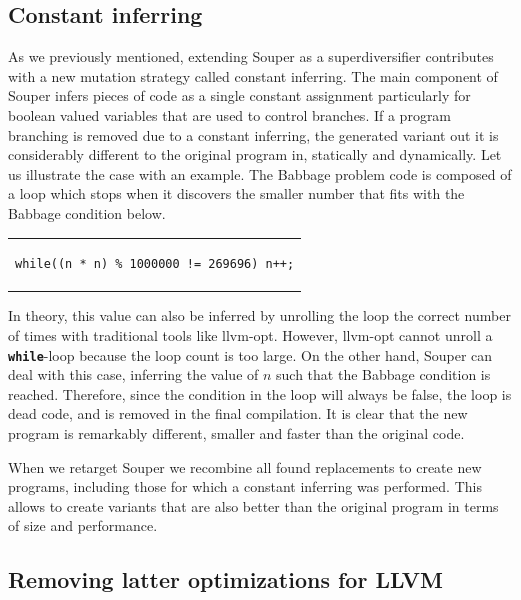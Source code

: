 \subsection*{Constant inferring}

As we previously mentioned, extending Souper as a superdiversifier contributes with a new mutation strategy called constant inferring. 
The main component of Souper infers pieces of code as a single constant assignment particularly for boolean valued variables that are used to control branches.
If a program branching is removed due to a constant inferring, the generated variant out it is considerably different to the original program in, statically and dynamically.
Let us illustrate the case with an example.
The Babbage problem code is composed of a loop which stops when it discovers the smaller number that fits with the Babbage condition below.
\begin{center}
\begin{tabular}{c}

\lstset{language=C++,
                    style=CStyle,
                    basicstyle=\small\ttfamily,
                    columns=fullflexible,
                    breaklines=true, 
                    postbreak=\mbox{\textcolor{red}{$\hookrightarrow$}\space}}
\begin{lstlisting}[]
while((n * n) % 1000000 != 269696) n++;
\end{lstlisting}
\end{tabular}
\end{center}
In theory, this value can also be inferred by unrolling the loop the correct number of times with traditional tools like llvm-opt.
However, llvm-opt cannot unroll a \texttt{\textbf{while}}-loop because the loop count is too large.
On the other hand, Souper can deal with this case, inferring the value of $n$ such that the Babbage condition is reached. Therefore, since the condition in the loop will always be false, the loop is dead code, and is removed in the final compilation. It is clear that the new program is remarkably different, smaller and faster than the original code.

When we retarget Souper we recombine all found replacements to create new programs, including those for which a constant inferring was performed.
This allows to create variants that are also better than the original program in terms of size and performance.

\subsection*{Removing latter optimizations for LLVM}

